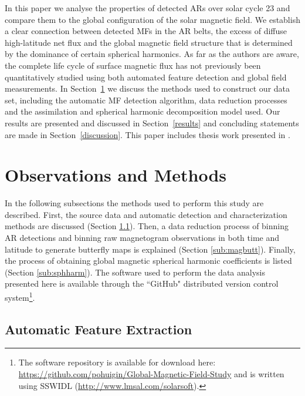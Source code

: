 \documentclass[namedreferences]{solarphysics}
\begin{document}
\begin{article}
In this paper we analyse the properties of detected ARs over solar cycle 23 and compare them to the global configuration of the solar magnetic field. %
We establish a clear connection between detected MFs in the AR belts, the excess of diffuse high-latitude net flux and the global magnetic field structure that is determined by the dominance of certain spherical harmonics. As far as the authors are aware, the complete life cycle of surface magnetic flux has not previously been quantitatively studied using both automated feature detection and global field measurements.  
In Section~\ref{obs_and_meth} we discuss the methods used to construct our data set, including the automatic MF detection algorithm, data reduction processes and the assimilation and spherical harmonic decomposition model used. Our results are presented and discussed in Section~\ref{results} and concluding statements are made in Section~\ref{discussion}. This paper includes thesis work presented in  \citet{Higgins:thesis}.


\section{Observations and Methods}\label{obs_and_meth}

In the following subsections the methods used to perform this study are described. First, the source data and automatic detection and characterization methods are discussed (Section \ref{sub:autofeat}). Then, a data reduction process of binning AR detections and binning raw magnetogram observations in both time and latitude to generate butterfly maps is explained (Section \ref{sub:magbutt}). Finally, the process of obtaining global magnetic spherical harmonic coefficients is listed (Section \ref{sub:sphharm}). The software used to perform the data analysis presented here is available through the ``GitHub" distributed version control system\footnote{The software repository is available for download here: \url{https://github.com/pohuigin/Global-Magnetic-Field-Study} and is written using SSWIDL (\url{http://www.lmsal.com/solarsoft}).}.


\subsection{Automatic Feature Extraction}\label{sub:autofeat}


\end{article}
\end{document}
